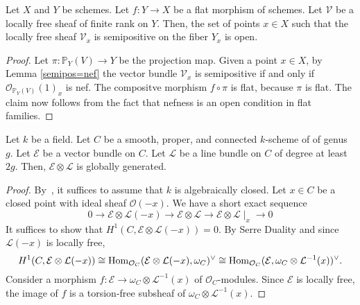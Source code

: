 \begin{lemma}\label{semipos_locus_open}
Let $X$ and $Y$ be schemes.
Let $f:Y\to X$ be a flat morphism of schemes.
Let $\mathcal{V}$ be a locally free sheaf of finite rank on $Y$.
Then, the set of points $x\in X$ such that the locally free sheaf
$\mathcal{V}_x$ is semipositive on the fiber $Y_x$ is open.
\end{lemma}

\begin{proof}
Let $\pi:\mathbb{P}_Y(V)\to Y$ be the projection map.
Given a point $x\in X$, by Lemma \ref{semipos=nef} the vector bundle
$\mathcal{V}_x$ is semipositive if and only if
$\mathcal{O}_{\mathbb{P}_Y(V)}(1)_x$ is nef.
The compositve morphism $f\circ \pi$ is flat, because $\pi$ is flat.
The claim now follows from the fact that nefness is an open condition in flat
families.
\end{proof}

\begin{lemma}\label{global_generation_of_twist_on_curve}
Let $k$ be a field.
Let $C$ be a smooth, proper, and connected $k$-scheme of of genus $g$.
Let $\mathcal{E}$ be a vector bundle on $C$.
Let $\mathcal{L}$ be a line bundle on $C$ of degree at least $2g$.
Then, $\mathcal{E}\otimes\mathcal{L}$ is globally generated.
\end{lemma}

\begin{proof}
By~, it suffices to assume that $k$ is algebraically closed.
Let $x\in C$ be a closed point with ideal sheaf $\mathcal{O}(-x)$.
We have a short exact sequence
\begin{equation}
  0 \to
  \mathcal{E} \otimes \mathcal{L}(-x) \to
  \mathcal{E} \otimes \mathcal{L} \to
  \mathcal{E} \otimes \mathcal{L}\mid_x \to
  0
\end{equation}
It suffices to show that $H^1(C,\mathcal{E}\otimes\mathcal{L}(-x)) = 0$.
By Serre Duality and
since $\mathcal{L}(-x)$ is locally free,
$$
H^1(C,\mathcal{E}\otimes\mathcal{L}(-x)) \cong
  \mathop{\rm Hom}\nolimits_{\mathcal{O}_C}(\mathcal{E} \otimes \mathcal{L}(-x),\omega_C)^\vee \cong
  \mathop{\rm Hom}\nolimits_{\mathcal{O}_C}(\mathcal{E},\omega_C\otimes\mathcal{L}^{-1}(x))^\vee.
$$
Consider a morphism $f : \mathcal{E} \to \omega_C \otimes \mathcal{L}^{-1}(x)$
of $\mathcal{O}_C$-modules.
Since $\mathcal{E}$ is locally free, the image of $f$ is a torsion-free
subsheaf of $\omega_C \otimes \mathcal{L}^{-1}(x)$.
\end{proof}


